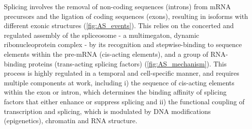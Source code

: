 Splicing involves the removal of non-coding sequences (introns) from mRNA precursors and the ligation of coding sequences (exons), resulting in isoforms with different exonic structures (\cref{fig:AS_events}). This relies on the concerted and regulated assembly of the spliceosome - a multimegaton, dynamic ribonucleoprotein complex - by its recognition and stepwise-binding to sequence elements within the pre-mRNA (cis-acting elements), and a group of RNA-binding proteins (trans-acting splicing factors) (\cref{fig:AS_mechanism}). This process is highly regulated in a temporal and cell-specific manner, and requires multiple components at work, including i) the sequence of cis-acting elements within the exon or intron, which determines the binding affinity of splicing factors that either enhance or suppress splicing and ii) the functional coupling of transcription and splicing, which is modulated by DNA modifications (epigenetics), chromatin and RNA structure. 


